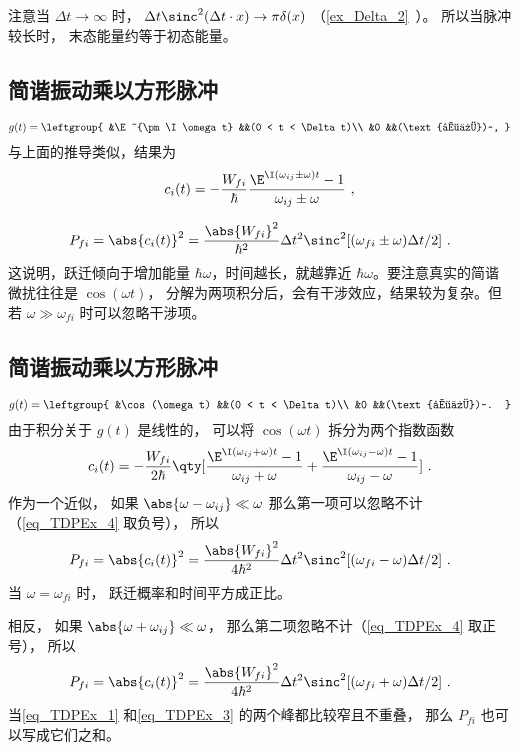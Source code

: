 注意当 $\Delta t \to \infty$ 时， $\Delta t\sinc^2(\Delta t\cdot x) \to \pi\delta(x)$ （\autoref{ex_Delta_2}~）。 所以当脉冲较长时， 末态能量约等于初态能量。

\subsection{简谐振动乘以方形脉冲}
\begin{equation}
g(t) = \leftgroup{
&\E^{\pm\I\omega t} &&(0 < t < \Delta t)\\
&0 &&(\text{其他})~,
}\end{equation}
与上面的推导类似，结果为
\begin{equation}\label{eq_TDPEx_4}
c_i(t) = -\frac{W_{fi}}{\hbar} \frac{\E^{\I(\omega_{ij} \pm \omega)t} - 1}{\omega_{ij} \pm \omega}~,
\end{equation}

\begin{equation}
P_{fi} = \abs{c_i(t)}^2 = \frac{\abs{W_{fi}}^2}{\hbar^2} \Delta t^2 \sinc^2[(\omega_{fi}\pm\omega)\Delta t/2]~.
\end{equation}
这说明，跃迁倾向于增加能量 $\hbar\omega$，时间越长，就越靠近 $\hbar\omega$。要注意真实的简谐微扰往往是 $\cos(\omega t)$， 分解为两项积分后，会有干涉效应，结果较为复杂。但若 $\omega \gg \omega_{fi}$ 时可以忽略干涉项。

\subsection{简谐振动乘以方形脉冲}
\begin{equation}
g(t) = \leftgroup{
&\cos(\omega t) &&(0 < t < \Delta t)\\
&0 &&(\text{其他})~.
}\end{equation}
由于积分关于 $g(t)$ 是线性的， 可以将 $\cos(\omega t)$ 拆分为两个指数函数
\begin{equation}
c_i(t) = -\frac{W_{fi}}{2\hbar} \qty[\frac{\E^{\I(\omega_{ij} + \omega)t} - 1}{\omega_{ij} + \omega} + \frac{\E^{\I(\omega_{ij} - \omega)t} - 1}{\omega_{ij} - \omega}]~.
\end{equation}
作为一个近似， 如果 $\abs{\omega - \omega_{ij}} \ll \omega$ 那么第一项可以忽略不计（\autoref{eq_TDPEx_4} 取负号）， 所以
\begin{equation}\label{eq_TDPEx_1}
P_{fi} = \abs{c_i(t)}^2 = \frac{\abs{W_{fi}}^2}{4\hbar^2} \Delta t^2 \sinc^2[(\omega_{fi}-\omega)\Delta t/2]~.
\end{equation}
当 $\omega = \omega_{fi}$ 时， 跃迁概率和时间平方成正比。

相反， 如果 $\abs{\omega + \omega_{ij}} \ll \omega$， 那么第二项忽略不计（\autoref{eq_TDPEx_4} 取正号）， 所以
\begin{equation}\label{eq_TDPEx_3}
P_{fi} = \abs{c_i(t)}^2 = \frac{\abs{W_{fi}}^2}{4\hbar^2} \Delta t^2 \sinc^2[(\omega_{fi}+\omega)\Delta t/2]~.
\end{equation}
当\autoref{eq_TDPEx_1} 和\autoref{eq_TDPEx_3} 的两个峰都比较窄且不重叠， 那么 $P_{fi}$ 也可以写成它们之和。
